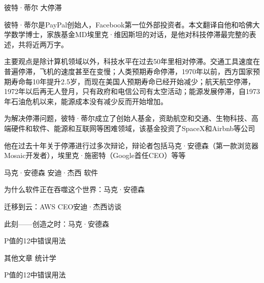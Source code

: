 

\begin{cventries}

  \cventry
    {彼特·蒂尔} %
    {大停滞} %
    {} %
    {} %
    {
      \begin{cvitems} %
        \item {彼特·蒂尔是PayPal创始人，Facebook第一位外部投资者。本文翻译自他和哈佛大学数学博士，家族基金MD埃里克·维因斯坦的对话，是他对科技停滞最完整的表述，共将近两万字。}
        \item {主要观点是除计算机领域以外，科技水平在过去50年里相对停滞。交通工具速度在普遍停滞，飞机的速度甚至在变慢；人类预期寿命停滞，1970年以前，西方国家预期寿命每10年提升2.5岁，而现在美国人预期寿命已经开始减少；航天航空停滞，1972年以后再无人登月，只有政府和电信公司有太空活动；能源发展停滞，自1973年石油危机以来，能源成本没有减少反而开始增加。}
        \item {为解决停滞问题，彼特·蒂尔成立了创始人基金，资助航空和交通、生物科技、高端硬件和软件、能源和互联网等困难领域，该基金投资了SpaceX和Airbnb等公司}
        \item {他在过去十年关于停滞进行过多次辩论，辩论者包括马克·安德森（第一款浏览器Mosaic开发者），埃里克·施密特（Google首任CEO）等等}
      \end{cvitems}
    }

    \cventry
    {马克·安德森 安迪·杰西} %
    {软件} %
    {} %
    {} %
    {
      \begin{cvitems} %
        \item {为什么软件正在吞噬这个世界：马克·安德森}
        \item {迁移到云：AWS CEO安迪·杰西访谈}
        \item {此刻——创造之时：马克·安德森}
        \item {P值的12中错误用法}
      \end{cvitems}
    }


    \cventry
    {其他文章} %
    {统计学} %
    {} %
    {} %
    {
      \begin{cvitems} %
        \item {P值的12中错误用法}
      \end{cvitems}
    }

\end{cventries}
